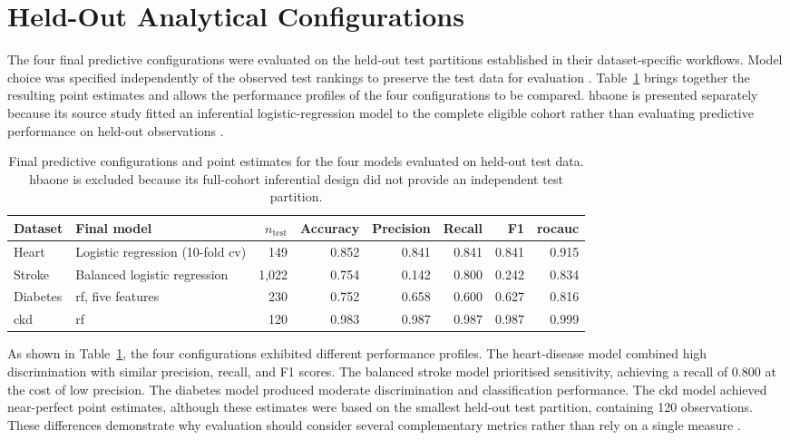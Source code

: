 \section{Held-Out Analytical Configurations}

The four final predictive configurations were evaluated on the held-out test partitions established in their dataset-specific workflows. Model choice was specified independently of the observed test rankings to preserve the test data for evaluation \citep{collins_tripodai_2024, moons_probastai_2025}. Table~\ref{tab:final_model_metrics} brings together the resulting point estimates and allows the performance profiles of the four configurations to be compared. \gls{hbaone} is presented separately because its source study fitted an inferential logistic-regression model to the complete eligible cohort rather than evaluating predictive performance on held-out observations \citep{strack_impact_2014}.

\begin{table}[htbp]
    \centering
    \small
    \caption{Final predictive configurations and point estimates for the four models evaluated on held-out test data. \gls{hbaone} is excluded because its full-cohort inferential design did not provide an independent test partition.}
    \label{tab:final_model_metrics}
    \setlength{\tabcolsep}{4pt}
    \begin{tabular}{@{}llrrrrrr@{}}
        \toprule
        \textbf{Dataset} &
        \textbf{Final model} &
        \textbf{$n_{\mathrm{test}}$} &
        \textbf{Accuracy} &
        \textbf{Precision} &
        \textbf{Recall} &
        \textbf{F1} &
        \textbf{\gls{rocauc}} \\
        \midrule
        Heart &
        Logistic regression (10-fold \gls{cv}) &
        149 & 0.852 & 0.841 & 0.841 & 0.841 & 0.915 \\
        Stroke &
        Balanced logistic regression &
        1,022 & 0.754 & 0.142 & 0.800 & 0.242 & 0.834 \\
        Diabetes &
        \Gls{rf}, five features &
        230 & 0.752 & 0.658 & 0.600 & 0.627 & 0.816 \\
        \gls{ckd} &
        \Gls{rf} &
        120 & 0.983 & 0.987 & 0.987 & 0.987 & 0.999 \\
        \bottomrule
    \end{tabular}
\end{table}

As shown in Table~\ref{tab:final_model_metrics}, the four configurations exhibited different performance profiles. The heart-disease model combined high discrimination with similar precision, recall, and F1 scores. The balanced stroke model prioritised sensitivity, achieving a recall of 0.800 at the cost of low precision. The diabetes model produced moderate discrimination and classification performance. The \gls{ckd} model achieved near-perfect point estimates, although these estimates were based on the smallest held-out test partition, containing 120 observations. These differences demonstrate why evaluation should consider several complementary metrics rather than rely on a single measure \citep{powers_evaluation_2011, saito_precision-recall_2015}.

